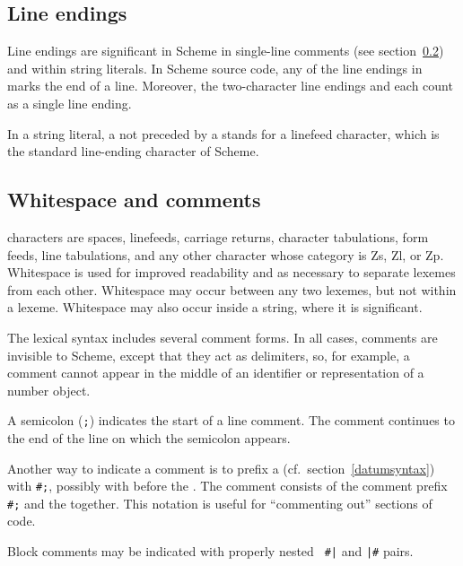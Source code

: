 \subsection{Line endings}
\label{lineendings}

Line endings are significant in Scheme in single-line comments (see
section~\ref{whitespaceandcomments}) and within string literals.  In
Scheme source code, any of the line endings in 
marks the end of a line.  Moreover, the two-character line endings
  and 
 each count as a single line ending.

In a string literal, a  not preceded by a {\cf\backwhack}
stands for a linefeed character, which is the standard line-ending
character of Scheme.

\subsection{Whitespace and comments}
\label{whitespaceandcomments}

 characters are spaces, linefeeds,
carriage returns, character tabulations, form feeds, line tabulations,
and any other character whose category is Zs, Zl, or Zp.
Whitespace is used for improved readability and
as necessary to separate lexemes from each other.  Whitespace may
occur between any two lexemes,
but not within a lexeme.  Whitespace may also occur inside a string,
where it is significant.

The lexical syntax includes several comment forms. In all cases,
comments are invisible to Scheme, except that they act as delimiters,
so, for example, a comment cannot appear in the middle of an
identifier or representation of a number object.

A semicolon ({\tt;}) indicates the start of a line
comment.\mainschindex{;} The comment continues to
the end of the line on which the semicolon appears.

Another way to indicate a comment is to prefix a 
(cf.\ section~\ref{datumsyntax}) with {\tt \#;}\sharpindex{;}, possibly with
 before the .  The comment consists of
the comment prefix {\tt \#;} and the  together.  This
notation is useful for ``commenting out'' sections of code.

Block comments may be indicated with properly nested {\tt
  \#|}
and {\tt |\#} pairs.

